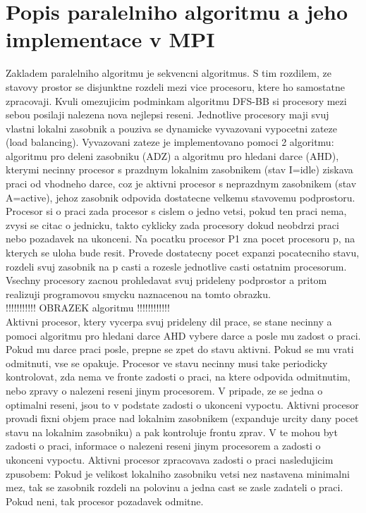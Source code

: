 \section{Popis paralelniho algoritmu a jeho implementace v MPI}
Zakladem paralelniho algoritmu je sekvencni algoritmus. S tim rozdilem, ze stavovy prostor se disjunktne rozdeli mezi vice procesoru, ktere ho samostatne zpracovaji. Kvuli omezujicim podminkam algoritmu DFS-BB si procesory mezi sebou posilaji nalezena nova nejlepsi reseni. Jednotlive procesory maji svuj vlastni lokalni zasobnik a pouziva se dynamicke vyvazovani vypocetni zateze (load balancing). Vyvazovani zateze je implementovano pomoci 2 algoritmu: algoritmu pro deleni zasobniku (ADZ) a algoritmu pro hledani darce (AHD), kterymi necinny procesor s prazdnym lokalnim zasobnikem (stav I=idle) ziskava praci od vhodneho darce, coz je aktivni procesor s neprazdnym zasobnikem (stav A=active), jehoz zasobnik odpovida dostatecne velkemu stavovemu podprostoru. Procesor si o praci zada procesor s cislem o jedno vetsi, pokud ten praci nema, zvysi se citac o jednicku, takto cyklicky zada procesory dokud neobdrzi praci nebo pozadavek na ukonceni. Na pocatku procesor P1 zna pocet procesoru p, na kterych se uloha bude resit. Provede dostatecny pocet expanzi pocatecniho stavu, rozdeli svuj zasobnik na p casti a rozesle jednotlive casti ostatnim procesorum. Vsechny procesory zacnou prohledavat svuj prideleny podprostor a pritom realizuji programovou smycku naznacenou na tomto obrazku.\\

!!!!!!!!!!!  OBRAZEK algoritmu !!!!!!!!!!!!\\

Aktivni procesor, ktery vycerpa svuj prideleny dil prace, se stane necinny a pomoci algoritmu pro hledani darce AHD vybere darce a posle mu zadost o praci. Pokud mu darce praci posle, prepne se zpet do stavu aktivni. Pokud se mu vrati odmitnuti, vse se opakuje. Procesor ve stavu necinny musi take periodicky kontrolovat, zda nema ve fronte zadosti o praci, na ktere odpovida odmitnutim, nebo zpravy o nalezeni reseni jinym procesorem. V pripade, ze se jedna o optimalni reseni, jsou to v podstate zadosti o ukonceni vypoctu. Aktivni procesor provadi fixni objem prace nad lokalnim zasobnikem (expanduje urcity dany pocet stavu na lokalnim zasobniku) a pak kontroluje frontu zprav. V te mohou byt zadosti o praci, informace o nalezeni reseni jinym procesorem a zadosti o ukonceni vypoctu. Aktivni procesor zpracovava zadosti o praci nasledujicim zpusobem: Pokud je velikost lokalniho zasobniku vetsi nez nastavena minimalni mez, tak se zasobnik rozdeli na polovinu a jedna cast se zasle zadateli o praci. Pokud neni, tak procesor pozadavek odmitne.

